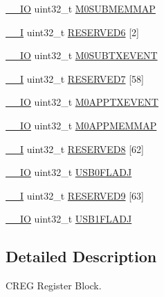 \begin{DoxyCompactItemize}
\hyperlink{core__sc300_8h_aec43007d9998a0a0e01faede4133d6be}{\+\_\+\+\_\+\+IO} uint32\+\_\+t \hyperlink{struct_l_p_c___c_r_e_g___t_acdbfb4b440575284d4b4e6da75f40b46}{M0\+S\+U\+B\+M\+E\+M\+M\+AP}
\item 
\hyperlink{core__sc300_8h_af63697ed9952cc71e1225efe205f6cd3}{\+\_\+\+\_\+I} uint32\+\_\+t \hyperlink{struct_l_p_c___c_r_e_g___t_af848a1615665ec38abf79c7bc74834ae}{R\+E\+S\+E\+R\+V\+E\+D6} \mbox{[}2\mbox{]}
\item 
\hyperlink{core__sc300_8h_aec43007d9998a0a0e01faede4133d6be}{\+\_\+\+\_\+\+IO} uint32\+\_\+t \hyperlink{struct_l_p_c___c_r_e_g___t_a80e553b85b2ea674ace4d6f073c24f81}{M0\+S\+U\+B\+T\+X\+E\+V\+E\+NT}
\item 
\hyperlink{core__sc300_8h_af63697ed9952cc71e1225efe205f6cd3}{\+\_\+\+\_\+I} uint32\+\_\+t \hyperlink{struct_l_p_c___c_r_e_g___t_a8a07cf48b8c6dfb9867eaa58f94a6276}{R\+E\+S\+E\+R\+V\+E\+D7} \mbox{[}58\mbox{]}
\item 
\hyperlink{core__sc300_8h_aec43007d9998a0a0e01faede4133d6be}{\+\_\+\+\_\+\+IO} uint32\+\_\+t \hyperlink{struct_l_p_c___c_r_e_g___t_a2a1c9a09437f0b4fa411e4d01cdf890d}{M0\+A\+P\+P\+T\+X\+E\+V\+E\+NT}
\item 
\hyperlink{core__sc300_8h_aec43007d9998a0a0e01faede4133d6be}{\+\_\+\+\_\+\+IO} uint32\+\_\+t \hyperlink{struct_l_p_c___c_r_e_g___t_a96b1e6e44c6d6f442ad472eeb394cfe2}{M0\+A\+P\+P\+M\+E\+M\+M\+AP}
\item 
\hyperlink{core__sc300_8h_af63697ed9952cc71e1225efe205f6cd3}{\+\_\+\+\_\+I} uint32\+\_\+t \hyperlink{struct_l_p_c___c_r_e_g___t_aad84aa62aedf7e70d0ae7519567eca60}{R\+E\+S\+E\+R\+V\+E\+D8} \mbox{[}62\mbox{]}
\item 
\hyperlink{core__sc300_8h_aec43007d9998a0a0e01faede4133d6be}{\+\_\+\+\_\+\+IO} uint32\+\_\+t \hyperlink{struct_l_p_c___c_r_e_g___t_a604a49c53d040c735f68917b74dc9ec0}{U\+S\+B0\+F\+L\+A\+DJ}
\item 
\hyperlink{core__sc300_8h_af63697ed9952cc71e1225efe205f6cd3}{\+\_\+\+\_\+I} uint32\+\_\+t \hyperlink{struct_l_p_c___c_r_e_g___t_a5776d08348209cfc8d998d5d6bcd2e3c}{R\+E\+S\+E\+R\+V\+E\+D9} \mbox{[}63\mbox{]}
\item 
\hyperlink{core__sc300_8h_aec43007d9998a0a0e01faede4133d6be}{\+\_\+\+\_\+\+IO} uint32\+\_\+t \hyperlink{struct_l_p_c___c_r_e_g___t_a322bbd6d33c40f51247772b994270f0c}{U\+S\+B1\+F\+L\+A\+DJ}
\end{DoxyCompactItemize}


\subsection{Detailed Description}
C\+R\+EG Register Block. 

